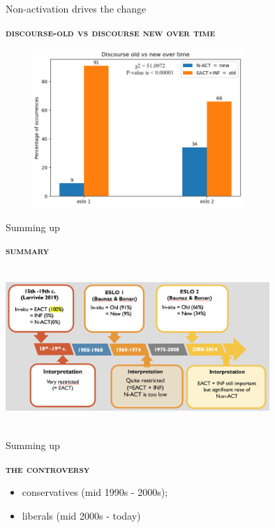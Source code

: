 \documentclass[lesson_slides]{subfiles}
\begin{document}
\begin{frame}[c]{Non-activation drives the change}

    \textbf{\textsc{discourse-old vs discourse new over time}}
    \begin{center}
        \includegraphics[width=10cm, height=6cm]{images/oldnewallchi.png}
    \end{center}
  
\end{frame}
\begin{frame}[c]{Summing up}

    \textbf{\textsc{summary}} \pause
    \begin{center}
        \includegraphics[width=10cm, height=6cm]{images/summary.png}
    \end{center}
  
\end{frame}
\begin{frame}[c]{Summing up}

    \textbf{\textsc{the controversy}} \pause
    \begin{itemize}
        \item[\ding{227}] conservatives (mid 1990s - 2000s);\\ \pause
        \item[\ding{227}] liberals (mid 2000s - today)\\
    \end{itemize}
  
\end{frame}
\end{document}
